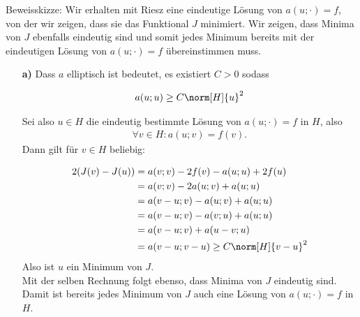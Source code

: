 \begin{solution}
Beweisskizze: Wir erhalten mit Riesz eine eindeutige Lösung von $a(u;\cdot) = f$, von der wir zeigen, dass
sie das Funktional $J$ minimiert. Wir zeigen, dass Minima von $J$ ebenfalls eindeutig sind
und somit jedes Minimum bereits mit der eindeutigen Lösung von $a(u;\cdot) = f$ übereinstimmen muss.
\begin{itemize}
  \item[\textbf{a)}]
  Dass $a$ elliptisch ist bedeutet, es existiert $C > 0$ sodass

  \begin{align*}
    a(u;u) \geq C \norm[H]{u}^2
  \end{align*}

  Sei also $u \in H$ die eindeutig bestimmte Lösung von $a(u;\cdot) = f$ in $H$, also
  \begin{align*}
    \forall v \in H: a(u;v) = f(v).
  \end{align*}
  Dann gilt für $v \in H$ beliebig:

  \begin{align*}
    2(J(v) - J(u)) &=
     a(v;v) - 2f(v) - a(u;u) + 2f(u) \\
     &=
     a(v;v) -2a(u;v) + a(u;u) \\
     &=
     a(v-u;v) - a(u;v) + a(u;u) \\
     &=
     a(v-u;v) - a(v;u) + a(u;u) \\
     &=
     a(v-u;v) + a(u-v;u) \\
     &=
     a(v-u;v-u)
     \geq
     C \norm[H]{v-u}^2
  \end{align*}
  Also ist $u$ ein Minimum von $J$. \\
  Mit der selben Rechnung folgt ebenso, dass Minima von $J$ eindeutig sind.
  Damit ist bereits jedes Minimum von $J$ auch eine Lösung von $a(u;\cdot) = f$ in $H$.


\end{itemize}
\end{solution}
